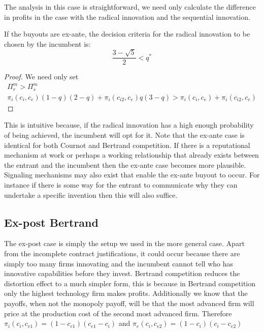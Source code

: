 The analysis in this case is straightforward, we need only calculate the difference in profits in the case with the radical innovation and the sequential innovation. 

\begin{proposition}
If the buyouts are ex-ante, the decision criteria for the radical innovation to be chosen by the incumbent is: 
\begin{equation*}
\frac{3-\sqrt{5}}{2}<q^*
\end{equation*}
\end{proposition}

\begin{proof}
We need only set 
\begin{align*}
\Pi_{r}^m >\Pi_{s}^m \\
\pi_i(c_i,c_e) (1-q) (2-q)+\pi_i(c_{i2},c_e) q (3-q)>\pi_i(c_i,c_e) +  \pi_i(c_{i2},c_e) 
\end{align*}
\end{proof}

This is intuitive because, if the radical innovation has a high enough probability of being achieved, the incumbent will opt for it. Note that the ex-ante case is identical for both Cournot and Bertrand competition. If there is a reputational mechanism at work or perhaps a working relationship that already exists between the entrant and the incumbent then the ex-ante case becomes more plausible. Signaling mechanisms may also exist that enable the ex-ante buyout to occur. For instance if there is some way for the entrant to communicate why they can undertake a specific invention then this will also suffice.

\subsection{Ex-post Bertrand}
The ex-post case is simply the setup we used in the more general case. Apart from the incomplete contract justifications, it could occur because there are simply too many firms innovating and the incumbent cannot tell who has innovative capabilities before they invest. Bertrand competition reduces the distortion effect to a much simpler form, this is because in Bertrand competition only the highest technology firm makes profits. Additionally we know that the payoffs, when not the monopoly payoff, will be that the most advanced firm will price at the production cost of the second most advanced firm. Therefore $\pi_i(c_i,c_{e1})= (1-c_{e1})(c_{e1}-c_i)$ and $\pi_e(c_i,c_{e2})= (1-c_{i})(c_{i}-c_{e2})$

